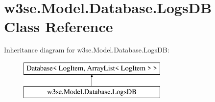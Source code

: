 \hypertarget{classw3se_1_1_model_1_1_database_1_1_logs_d_b}{\section{w3se.\-Model.\-Database.\-Logs\-D\-B Class Reference}
\label{classw3se_1_1_model_1_1_database_1_1_logs_d_b}
}
Inheritance diagram for w3se.\-Model.\-Database.\-Logs\-D\-B\-:\begin{figure}[H]
\begin{center}
\leavevmode
\includegraphics[height=2.000000cm]{classw3se_1_1_model_1_1_database_1_1_logs_d_b}
\end{center}
\end{figure}
